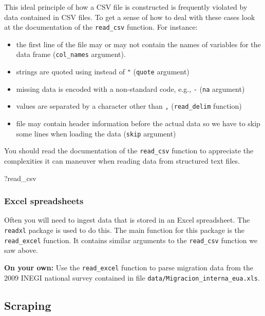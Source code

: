 \documentclass[]{article}
\newenvironment{Shaded}{\begin{snugshade}}{\end{snugshade}}
\newcommand{\NormalTok}[1]{{#1}}
\theoremstyle{definition}
\theoremstyle{definition}
\theoremstyle{remark}
\begin{document}
This ideal principle of how a CSV file is constructed is frequently
violated by data contained in CSV files. To get a sense of how to deal
with these cases look at the documentation of the \texttt{read\_csv}
function. For instance:

\begin{itemize}
\item
  the first line of the file may or may not contain the names of
  variables for the data frame (\texttt{col\_names} argument).
\item
  strings are quoted using \texttt{\textquotesingle{}} instead of
  \texttt{"} (\texttt{quote} argument)
\item
  missing data is encoded with a non-standard code, e.g., \texttt{-}
  (\texttt{na} argument)
\item
  values are separated by a character other than \texttt{,}
  (\texttt{read\_delim} function)
\item
  file may contain header information before the actual data so we have
  to skip some lines when loading the data (\texttt{skip} argument)
\end{itemize}

You should read the documentation of the \texttt{read\_csv} function to
appreciate the complexities it can maneuver when reading data from
structured text files.

\begin{Shaded}
\begin{Highlighting}[]
\NormalTok{?read_csv}
\end{Highlighting}
\end{Shaded}

\subsubsection{Excel spreadsheets}\label{excel-spreadsheets}

Often you will need to ingest data that is stored in an Excel
spreadsheet. The \texttt{readxl} package is used to do this. The main
function for this package is the \texttt{read\_excel} function. It
contains similar arguments to the \texttt{read\_csv} function we saw
above.

\textbf{On your own:} Use the \texttt{read\_excel} function to parse
migration data from the 2009 INEGI national survey contained in file
\texttt{data/Migracion\_interna\_eua.xls}.

\subsection{Scraping}\label{scraping}
\end{document}

